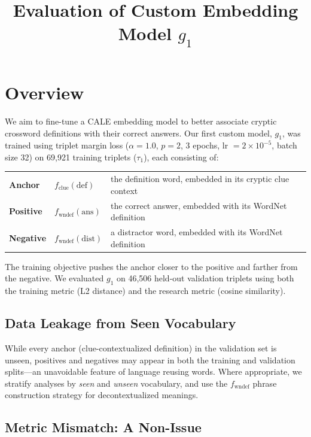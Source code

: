 \documentclass[11pt]{article}
\title{Evaluation of Custom Embedding Model $g_1$}
\author{}
\date{}
\begin{document}
\maketitle
\vspace{-4em}

\section*{Overview}

We aim to fine-tune a CALE embedding model to better associate cryptic crossword
definitions with their correct answers. Our first custom model, $g_1$, was trained using triplet margin loss
($\alpha = 1.0$, $p = 2$, 3 epochs, lr $= 2 \times 10^{-5}$, batch size 32)
on 69,921 training triplets ($\tau_1$), each consisting of:

\begin{center}
\begin{tabular}{@{}lll@{}}
\textbf{Anchor} & $f_{\text{clue}}(\text{def}) $ & the definition word, embedded in its cryptic clue context \\
\textbf{Positive} & $f_{\text{wndef}}(\text{ans})$ & the correct answer, embedded with its WordNet definition \\
\textbf{Negative} & $f_{\text{wndef}}(\text{dist})$ & a distractor word, embedded with its WordNet definition \\
\end{tabular}
\end{center}

\noindent The training objective pushes the anchor closer to the positive and
farther from the negative. We evaluated $g_1$ on 46,506 held-out validation 
triplets using both the
training metric (L2 distance) and the research metric (cosine similarity). 

\subsection*{Data Leakage from Seen Vocabulary}

While every anchor (clue-contextualized definition) in the validation set is 
unseen, positives and negatives 
may appear in both the training and validation splits---an unavoidable feature 
of language reusing words. Where appropriate, we stratify analyses by \emph{seen} 
and \emph{unseen} vocabulary, and use the $f_{\text{wndef}}$ phrase construction
strategy for decontextualized meanings.

\subsection*{Metric Mismatch: A Non-Issue}
\end{document}
